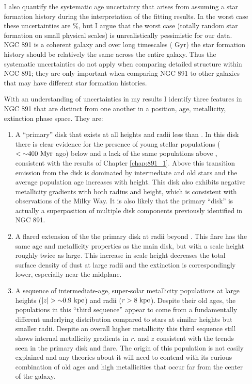 I also quantify the systematic age uncertainty that arises from
assuming a star formation history during the interpretation of the
fitting results. In the worst case these uncertainties are \%,
but I argue that the worst case (totally random star formation on
small physical scales) is unrealistically pessimistic for our
data. NGC 891 is a coherent galaxy and over long timescales (
Gyr) the star formation history should be relatively the same across
the entire galaxy. Thus the systematic uncertainties do not apply when
comparing detailed structure within NGC 891; they are only important
when comparing NGC 891 to other galaxies that may have different star
formation histories.

With an understanding of uncertainties in my results I identify three
features in NGC 891 that are distinct from one another in a position,
age, metallicity, extinction phase space. They are:
\begin{enumerate}

\item A ``primary'' disk that exists at all heights and radii less
  than . In this disk there is clear evidence for the
  presence of young stellar populations ($< {\sim} 400~\mathrm{Myr} $ ago)
  below  and a lack of the same populations above
  , consistent with the results of Chapter
  \ref{chap:891_1}. Above this transition emission from the disk is
  dominated by intermediate and old stars and the average population
  age increases with height. This disk also exhibits negative
  metallicity gradients with both radius and height, which is
  consistent with observations of the Milky Way. It is also likely
  that the primary ``disk'' is actually a superposition of multiple
  disk components previously identified in NGC 891.

\item A flared extension of the the primary disk at radii beyond
  . This flare has the same age and metallicity properties
  as the main disk, but with a scale height roughly twice as
  large. This increase in scale height decreases the total surface
  density of dust at large radii and the extinction is correspondingly
  lower, especially near the midplane.
  
\item A sequence of intermediate-age, super-solar metallicity
  populations at large heights ($|z|> \val{\asim 0.9}{kpc}$) and radii
  ($r>8~\mathrm{kpc} $). Despite their old ages, the populations in this
  ``third sequence'' appear to come from a fundamentally different
  underlying distribution compared to stars at similar heights but
  smaller radii. Despite an overall higher metallicity this third
  sequence still shows internal metallicity gradients in $r$, and $z$
  consistent with the trends seen in the primary disk and flare. The
  origin of this population is not easily explained and any theories
  about it will need to contend with its curious combination of old
  ages and high metallicities that occur far from the center of the
  galaxy.

\end{enumerate}

